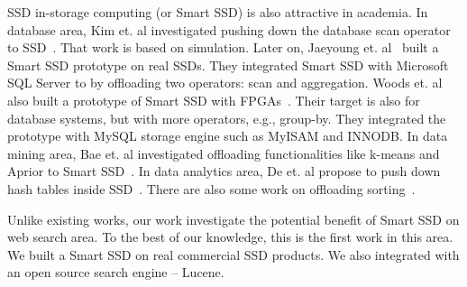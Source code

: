 SSD in-storage computing (or Smart SSD) is also attractive in academia. In database area, Kim et. al investigated pushing down the database scan operator to SSD~\cite{KimOPCL11}.
That work is based on simulation. Later on, Jaeyoung et. al~\cite{Do2013QPS} built a Smart SSD prototype on real SSDs. They integrated Smart SSD with Microsoft SQL Server to by offloading two operators: scan and aggregation. Woods et. al also built a prototype of Smart SSD with FPGAs~\cite{WoodsIA14}. Their target is also for database systems, but with more operators, e.g., group-by. They integrated the prototype with MySQL storage engine such as MyISAM and INNODB. In data mining area, Bae et. al investigated offloading functionalities like k-means and Aprior to Smart SSD~\cite{BaeKKOP13}. In data analytics area, De et. al propose to push down hash tables inside SSD~\cite{De2013}. There are also some work on offloading sorting~\cite{Young14}.

Unlike existing works, our work investigate the potential benefit of Smart SSD on web search area. To the best of our knowledge, this is the first work in this area. We built a Smart SSD on real commercial SSD products. We also integrated with an open source search engine -- Lucene.
